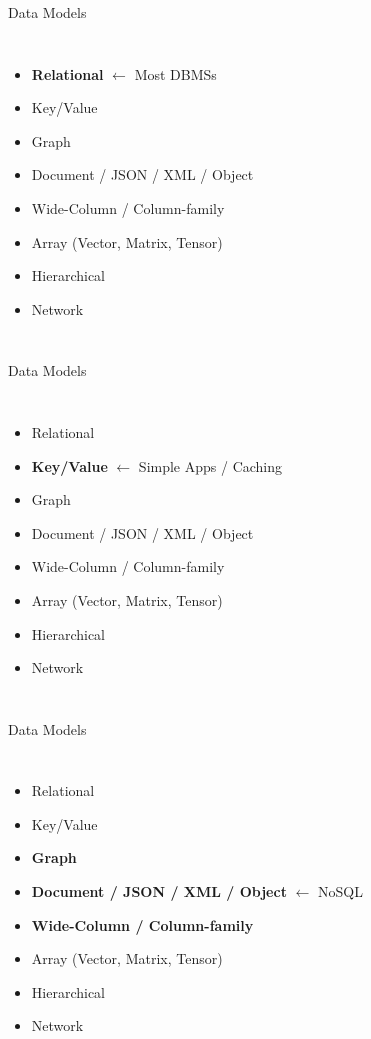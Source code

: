 \documentclass[aspectratio=169, 10pt]{beamer}
\begin{document}
\begin{frame}{Data Models}
    \begin{columns}
        \begin{itemize}
            \item \textbf{Relational} $\leftarrow$ Most DBMSs
            \item Key/Value
            \item Graph
            \item Document / JSON / XML / Object
            \item Wide-Column / Column-family
            \item Array (Vector, Matrix, Tensor)
            \item Hierarchical
            \item Network
        \end{itemize}
    \end{columns}
\end{frame}

\begin{frame}{Data Models}
    \begin{columns}
        \begin{itemize}
            \item Relational
            \item \textbf{Key/Value} $\leftarrow$ Simple Apps / Caching
            \item Graph
            \item Document / JSON / XML / Object
            \item Wide-Column / Column-family
            \item Array (Vector, Matrix, Tensor)
            \item Hierarchical
            \item Network
        \end{itemize}
    \end{columns}
\end{frame}

\begin{frame}{Data Models}
    \begin{columns}
        \begin{itemize}
            \item Relational
            \item Key/Value
            \item \textbf{Graph}
            \item \textbf{Document / JSON / XML / Object} $\leftarrow$ NoSQL
            \item \textbf{Wide-Column / Column-family}
            \item Array (Vector, Matrix, Tensor)
            \item Hierarchical
            \item Network
        \end{itemize}
    \end{columns}
\end{frame}
\end{document}
